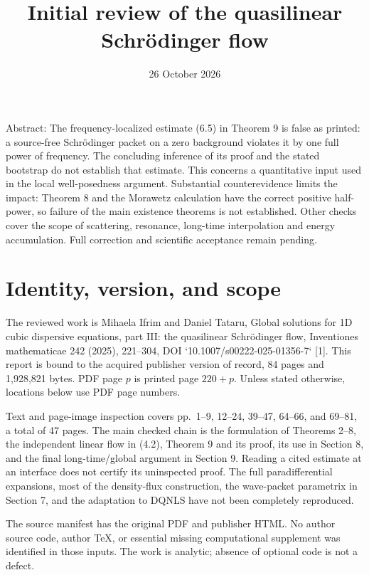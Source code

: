 \documentclass[10pt]{article}
\title{Initial review of the quasilinear Schrödinger flow}
\author{}
\date{26 October 2026}
\begin{document}
\maketitle
Abstract: The frequency-localized estimate (6.5) in Theorem 9 is false as printed: a source-free Schrödinger packet on a zero background violates it by one full power of frequency. The concluding inference of its proof and the stated bootstrap do not establish that estimate. This concerns a quantitative input used in the local well-posedness argument. Substantial counterevidence limits the impact: Theorem 8 and the Morawetz calculation have the correct positive half-power, so failure of the main existence theorems is not established. Other checks cover the scope of scattering, resonance, long-time interpolation and energy accumulation. Full correction and scientific acceptance remain pending.\par
\section*{Identity, version, and scope}
The reviewed work is Mihaela Ifrim and Daniel Tataru, Global solutions for 1D cubic dispersive equations, part III: the quasilinear Schrödinger flow, Inventiones mathematicae 242 (2025), 221–304, DOI `10.1007/s00222-025-01356-7` [1]. This report is bound to the acquired publisher version of record, 84 pages and 1,928,821 bytes. PDF page \(p\) is printed page \(220+p\). Unless stated otherwise, locations below use PDF page numbers.\par
Text and page-image inspection covers pp. 1–9, 12–24, 39–47, 64–66, and 69–81, a total of 47 pages. The main checked chain is the formulation of Theorems 2–8, the independent linear flow in (4.2), Theorem 9 and its proof, its use in Section 8, and the final long-time/global argument in Section 9. Reading a cited estimate at an interface does not certify its uninspected proof. The full paradifferential expansions, most of the density-flux construction, the wave-packet parametrix in Section 7, and the adaptation to DQNLS have not been completely reproduced.\par
The source manifest has the original PDF and publisher HTML. No author source code, author TeX, or essential missing computational supplement was identified in those inputs. The work is analytic; absence of optional code is not a defect.\par
\end{document}
